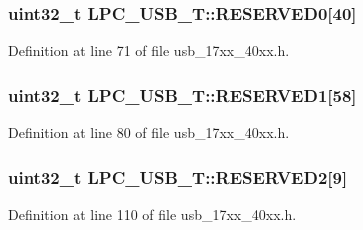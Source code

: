 \subsubsection[{\texorpdfstring{R\+E\+S\+E\+R\+V\+E\+D0}{RESERVED0}}]{\setlength{\rightskip}{0pt plus 5cm}uint32\+\_\+t L\+P\+C\+\_\+\+U\+S\+B\+\_\+\+T\+::\+R\+E\+S\+E\+R\+V\+E\+D0\mbox{[}40\mbox{]}}\hypertarget{structLPC__USB__T_a3aff3a8e76053fa15333e688e8056969}{}\label{structLPC__USB__T_a3aff3a8e76053fa15333e688e8056969}


Definition at line 71 of file usb\+\_\+17xx\+\_\+40xx.\+h.

\subsubsection[{\texorpdfstring{R\+E\+S\+E\+R\+V\+E\+D1}{RESERVED1}}]{\setlength{\rightskip}{0pt plus 5cm}uint32\+\_\+t L\+P\+C\+\_\+\+U\+S\+B\+\_\+\+T\+::\+R\+E\+S\+E\+R\+V\+E\+D1\mbox{[}58\mbox{]}}\hypertarget{structLPC__USB__T_a5ceee0a1fa85f9d1cd515dac7c649015}{}\label{structLPC__USB__T_a5ceee0a1fa85f9d1cd515dac7c649015}


Definition at line 80 of file usb\+\_\+17xx\+\_\+40xx.\+h.

\subsubsection[{\texorpdfstring{R\+E\+S\+E\+R\+V\+E\+D2}{RESERVED2}}]{\setlength{\rightskip}{0pt plus 5cm}uint32\+\_\+t L\+P\+C\+\_\+\+U\+S\+B\+\_\+\+T\+::\+R\+E\+S\+E\+R\+V\+E\+D2\mbox{[}9\mbox{]}}\hypertarget{structLPC__USB__T_af783a91fcb65afd51f312c8d7ee17faf}{}\label{structLPC__USB__T_af783a91fcb65afd51f312c8d7ee17faf}


Definition at line 110 of file usb\+\_\+17xx\+\_\+40xx.\+h.

